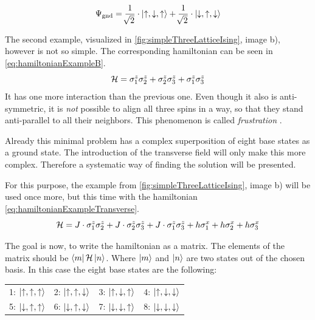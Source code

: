 \begin{equation}
    \label{eq:solutionSimpleExample}
    \Psi_\mathrm{gnd} = \frac{1}{\sqrt[]{2}} \cdot \ket{\uparrow, \downarrow, \uparrow} +  \frac{1}{\sqrt[]{2}} \cdot \ket{\downarrow, \uparrow, \downarrow}
\end{equation}

The second example, visualized in \autoref{fig:simpleThreeLatticeIsing}, image b), however is not so simple. The corresponding hamiltonian can be seen in \ref{eq:hamiltonianExampleB}.
\begin{equation}
    \label{eq:hamiltonianExampleB}
    \mathcal{H} = \sigma^z_1\sigma^z_2 +\sigma^z_2\sigma^z_3 +\sigma^z_1\sigma^z_3
\end{equation}
It has one more interaction than the previous one. Even though it also is anti-symmetric, it is \emph{not} possible to align all three spins in a way, so that they stand anti-parallel to all their neighbors. This phenomenon is called \emph{frustration} \cite*{frustration}.

Already this minimal problem has a complex superposition of eight base states as a ground state. The introduction of the transverse field will only make this more complex. Therefore a systematic way of finding the solution will be presented.

For this purpose, the example from \autoref{fig:simpleThreeLatticeIsing}, image b) will be used once more, but this time with the hamiltonian \ref{eq:hamiltonianExampleTransverse}.
\begin{equation}
    \label{eq:hamiltonianExampleTransverse}
    \mathcal{H} = J\cdot \sigma^z_1\sigma^z_2 +J\cdot\sigma^z_2\sigma^z_3 +J\cdot\sigma^z_1\sigma^z_3
    +h \sigma^x_1+h \sigma^x_2+h \sigma^x_3
\end{equation}

The goal is now, to write the hamiltonian \hamiltonian as a matrix. 
The elements of the matrix should be $\bra{m}\mathcal{H}\ket{n}$. Where $\ket{m}$ and $\ket{n}$ are two states out of the chosen basis. In this case the eight base states are the following:

\begin{center}
    \begin{tabular}{llll} 
        1: $\ket{\uparrow, \uparrow, \uparrow}$ & 2: $\ket{\uparrow, \uparrow, \downarrow}$  & 3: $\ket{\uparrow, \downarrow, \uparrow}$  & 4: $\ket{\uparrow, \downarrow, \downarrow}$ \\
        5: $\ket{\downarrow, \uparrow, \uparrow}$ & 6: $\ket{\downarrow, \uparrow, \downarrow}$  & 7: $\ket{\downarrow, \downarrow, \uparrow}$  & 8: $\ket{\downarrow, \downarrow, \downarrow}$ 
    \end{tabular}
\end{center}


